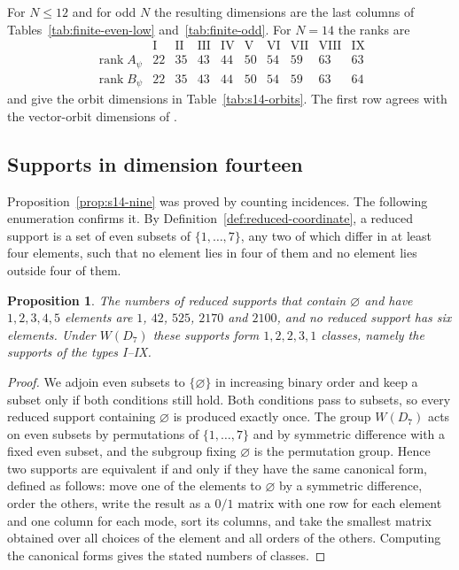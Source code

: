 \documentclass{article}
\newtheorem{proposition}[theorem]{Proposition}
\theoremstyle{definition}
\theoremstyle{remark}
\begin{document}
For $N\le12$ and for odd $N$ the resulting dimensions are the last columns of
Tables~\ref{tab:finite-even-low} and~\ref{tab:finite-odd}. For $N=14$ the
ranks are
\[
\begin{array}{c|ccccccccc}
 &\mathrm I&\mathrm{II}&\mathrm{III}&\mathrm{IV}&\mathrm V&\mathrm{VI}
 &\mathrm{VII}&\mathrm{VIII}&\mathrm{IX}\\\hline
 \operatorname{rank}A_\psi&22&35&43&44&50&54&59&63&63\\
 \operatorname{rank}B_\psi&22&35&43&44&50&54&59&63&64
\end{array}
\]
and give the orbit dimensions in Table~\ref{tab:s14-orbits}. The first row
agrees with the vector-orbit dimensions of \cite[Table~1]{Gatti_dim13}.

\subsection{Supports in dimension fourteen}
\label{app:s14-enumeration}

Proposition~\ref{prop:s14-nine} was proved by counting incidences. The
following enumeration confirms it. By
Definition~\ref{def:reduced-coordinate}, a reduced support is a set of even
subsets of $\{1,\ldots,7\}$, any two of which differ in at least four
elements, such that no element lies in four of them and no element lies
outside four of them.

\begin{proposition}
\label{prop:s14-enumeration}
The numbers of reduced supports that contain $\varnothing$ and have
$1,2,3,4,5$ elements are $1$, $42$, $525$, $2170$ and $2100$, and no reduced
support has six elements. Under $W(D_7)$ these supports form $1,2,2,3,1$
classes, namely the supports of the types I--IX.
\end{proposition}

\begin{proof}
We adjoin even subsets to $\{\varnothing\}$ in increasing binary order and
keep a subset only if both conditions still hold. Both conditions pass to
subsets, so every reduced support containing $\varnothing$ is produced exactly
once. The group $W(D_7)$ acts on even subsets by permutations of
$\{1,\ldots,7\}$ and by symmetric difference with a fixed even subset, and
the subgroup fixing $\varnothing$ is the permutation group. Hence two supports
are equivalent if and only if they have the same canonical form, defined as
follows: move one of the elements to $\varnothing$ by a symmetric difference,
order the others, write the result as a $0/1$ matrix with one row for each
element and one column for each mode, sort its columns, and take the smallest
matrix obtained over all choices of the element and all orders of the others.
Computing the canonical forms gives the stated numbers of classes.
\end{proof}
\end{document}
